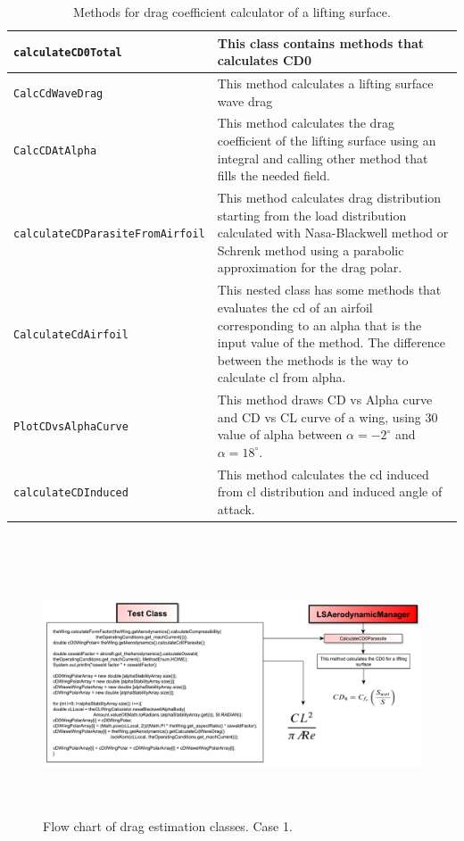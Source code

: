 \begin{table}[H]
\begin{tabular}{p{7cm}p{7.5cm}}
\toprule
\lstinline[language=Java]!calculateCD0Total! & This class contains methods that calculates CD0\\ \hline 
\lstinline[language=Java]!CalcCdWaveDrag! & This method calculates a lifting surface wave drag\\ \hline 
\lstinline[language=Java]!CalcCDAtAlpha! & This method calculates the drag coefficient of the lifting surface using an integral and calling other method that fills the needed field. \\ \hline 
\lstinline[language=Java]!calculateCDParasiteFromAirfoil! &This method calculates drag distribution starting from the load distribution calculated with Nasa-Blackwell method or Schrenk method using a parabolic approximation for the drag polar.  
\\ \hline 
\lstinline[language=Java]!CalculateCdAirfoil! & This nested class has some methods that evaluates the cd of an airfoil corresponding to an alpha that is the input value of the method. The difference between the methods is the way to calculate cl from alpha.\\ \hline 
\lstinline[language=Java]!PlotCDvsAlphaCurve! & This method draws CD vs Alpha curve and CD vs CL curve of a wing, using 30 value of alpha between $\alpha=- 2^{\circ}$ and $\alpha = 18^{\circ}$.\\ \hline 
\lstinline[language=Java]!calculateCDInduced! & This method calculates the cd induced from cl distribution and induced angle of attack. \\ \hline 
\bottomrule
\end{tabular}
\caption{Methods for drag coefficient calculator of a lifting surface.}
\label{table:Table2}
\end{table}

\noindent\\
\begin{figure}[H]
\centering
{\includegraphics[height=7cm]{immagini/dragflowchartcd0.pdf}}
\caption{Flow chart of drag estimation classes. Case 1.}
\label{fig:cd}
\end{figure}

